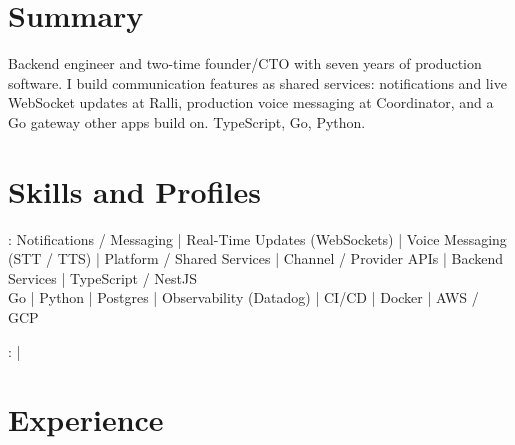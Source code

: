 \documentclass[print]{jack-resume}
\begin{document}
\pagecolor{darkmodeBackground}


\begin{minipage}[t][1cm][t]{.03\textwidth}
    \hfill
\end{minipage}

\section{Summary}
Backend engineer and two-time founder/CTO with seven years of production software. I build communication features as shared services: notifications and live WebSocket updates at Ralli, production voice messaging at Coordinator, and a Go gateway other apps build on. TypeScript, Go, Python.
\sectionsep

\section{Skills and Profiles}
:
Notifications / Messaging \hfill | \hfill
Real-Time Updates (WebSockets) \hfill | \hfill
Voice Messaging (STT / TTS) \hfill | \hfill
Platform / Shared Services \hfill | \hfill
Channel / Provider APIs \hfill | \hfill
Backend Services \hfill | \hfill
TypeScript / NestJS \\
\hspace{1.0cm} Go \hfill | \hfill
Python \hfill | \hfill
Postgres \hfill | \hfill
Observability (Datadog) \hfill | \hfill
CI/CD \hfill | \hfill
Docker \hfill | \hfill
AWS / GCP \\

\raggedright{
    :
      \href{https://www.linkedin.com/in/jack-sturtevant/}{ \ExternalLink} |
     \href{https://github.com/jacksturt}{ \ExternalLink}}

\section{Experience}
\end{document}
